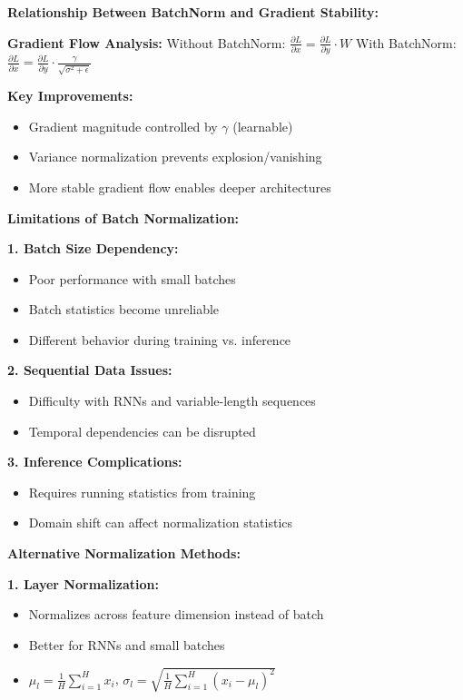 \documentclass[12pt]{article}
\begin{document}
\begin{enumerate}[(a)]
{    \textbf{Relationship Between BatchNorm and Gradient Stability:}
    
    \textbf{Gradient Flow Analysis:}
    Without BatchNorm: $\frac{\partial L}{\partial x} = \frac{\partial L}{\partial y} \cdot W$
    With BatchNorm: $\frac{\partial L}{\partial x} = \frac{\partial L}{\partial y} \cdot \frac{\gamma}{\sqrt{\sigma^2 + \epsilon}}$
    
    \textbf{Key Improvements:}
    \begin{itemize}
        \item Gradient magnitude controlled by $\gamma$ (learnable)
        \item Variance normalization prevents explosion/vanishing
        \item More stable gradient flow enables deeper architectures
    \end{itemize}
    
    \textbf{Limitations of Batch Normalization:}
    
    \textbf{1. Batch Size Dependency:}
    \begin{itemize}
        \item Poor performance with small batches
        \item Batch statistics become unreliable
        \item Different behavior during training vs. inference
    \end{itemize}
    
    \textbf{2. Sequential Data Issues:}
    \begin{itemize}
        \item Difficulty with RNNs and variable-length sequences
        \item Temporal dependencies can be disrupted
    \end{itemize}
    
    \textbf{3. Inference Complications:}
    \begin{itemize}
        \item Requires running statistics from training
        \item Domain shift can affect normalization statistics
    \end{itemize}
    
    \textbf{Alternative Normalization Methods:}
    
    \textbf{1. Layer Normalization:}
    \begin{itemize}
        \item Normalizes across feature dimension instead of batch
        \item Better for RNNs and small batches
        \item $\mu_l = \frac{1}{H} \sum_{i=1}^H x_i$, $\sigma_l = \sqrt{\frac{1}{H} \sum_{i=1}^H (x_i - \mu_l)^2}$
    \end{itemize}
    
}
\end{enumerate}
\end{document}
